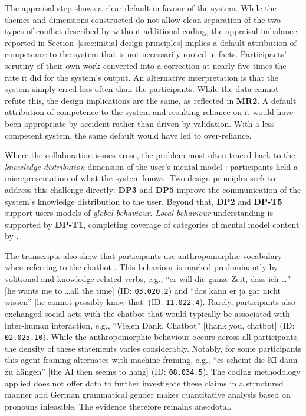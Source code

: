 The appraisal step shows a clear default in favour of the system. While the themes and dimensions constructed do not allow clean separation of the two types of conflict described by \textcite{Jussupow2021} without additional coding, the appraisal imbalance reported in Section~\ref{ssec:initial-design-principles} implies a default attribution of competence to the system that is not necessarily rooted in facts. Participants' scrutiny of their own work converted into a correction at nearly five times the rate it did for the system's output. An alternative interpretation is that the system simply erred less often than the participants. While the data cannot refute this, the design implications are the same, as reflected in \textbf{MR2}. A default attribution of competence to the system and resulting reliance on it would have been appropriate by accident rather than driven by validation. With a less competent system, the same default would have led to over-reliance.

Where the collaboration issues arose, the problem most often traced back to the \textit{knowledge distribution} dimension of the user's mental model \parencite{Gero2020}: participants held a misrepresentation of what the system knows. Two design principles seek to address this challenge directly: \textbf{DP3} and \textbf{DP5} improve the communication of the system's knowledge distribution to the user. Beyond that, \textbf{DP2} and \textbf{DP-T5} support users models of \textit{global behaviour}. \textit{Local behaviour} understanding is supported by \textbf{DP-T1}, completing coverage of categories of mental model content by \textcite{Gero2020}.

The transcripts also show that participants use anthropomorphic vocabulary when referring to the chatbot \parencite[cf.][]{Weisz2025}. This behaviour is marked predominantly by volitional and knowledge-related verbs, e.g., \enquote{er will die ganze Zeit, dass ich \ldots} [he wants me to \ldots all the time] (ID: \texttt{03.020.2}) and \enquote{das kann er ja gar nicht wissen} [he cannot possibly know that] (ID: \texttt{11.022.4}). Rarely, participants also exchanged social acts with the chatbot that would typically be associated with inter-human interaction, e.g., \enquote{Vielen Dank, Chatbot} [thank you, chatbot] (ID: \texttt{02.025.10}). While the anthropomorphic behaviour occurs across all participants, the density of these statements varies considerably. Notably, for some participants this agent framing alternates with machine framing, e.g., \enquote{es scheint die KI dann zu hängen} [the AI then seems to hang] (ID: \texttt{08.034.5}). The coding methodology applied does not offer data to further investigate these claims in a structured manner and German grammatical gender makes quantitative analysis based on pronouns infeasible. The evidence therefore remains anecdotal.

